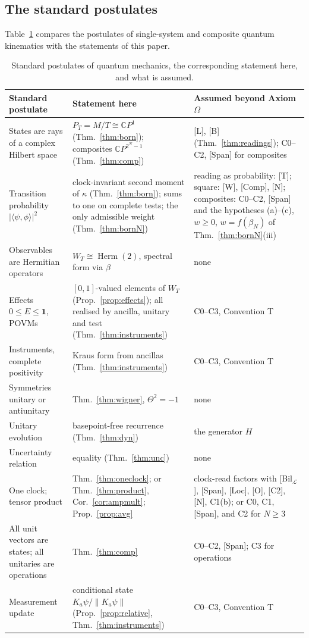 \documentclass[aps,pra,onecolumn,superscriptaddress,nofootinbib,10pt]{revtex4-2}
\theoremstyle{definition}
\theoremstyle{remark}
\newcommand{\C}{\mathbb{C}}
\newcommand{\cL}{\mathcal{L}}
\newcommand{\Herm}{\operatorname{Herm}}
\newcommand{\ip}[2]{\langle #1,#2\rangle}
\begin{document}
\subsection{The standard postulates}
Table~\ref{tab:postulates} compares the postulates of single-system and composite quantum kinematics
with the statements of this paper.

\begin{table}[h]
\caption{Standard postulates of quantum mechanics, the corresponding statement here, and what is assumed.}
\label{tab:postulates}
\footnotesize
\begin{tabular}{@{}p{}p{}p{}@{}}
\toprule
Standard postulate & Statement here & Assumed beyond Axiom $\Omega$\\
\midrule
States are rays of a complex Hilbert space & $P_T=M/T\cong\C P^1$ (Thm.~\ref{thm:born}); composites $\C P^{2^N-1}$ (Thm.~\ref{thm:comp}) & [L], [B] (Thm.~\ref{thm:readings}); C0--C2, [Span] for composites\\
Transition probability $\lvert\ip{\psi}{\phi}\rvert^2$ & clock-invariant second moment of $\kappa$ (Thm.~\ref{thm:born}); sums to one on complete tests; the only admissible weight (Thm.~\ref{thm:bornN}) & reading as probability: [T]; square: [W], [Comp], [N]; composites: C0--C2, [Span] and the hypotheses (a)--(c), $w\ge0$, $w=f(\beta_N)$ of Thm.~\ref{thm:bornN}(iii)\\
Observables are Hermitian operators & $W_T\cong\Herm(2)$, spectral form via $\beta$ & none\\
Effects $0\le E\le\mathbf1$, POVMs & $[0,1]$-valued elements of $W_T$ (Prop.~\ref{prop:effects}); all realised by ancilla, unitary and test (Thm.~\ref{thm:instruments}) & C0--C3, Convention T\\
Instruments, complete positivity & Kraus form from ancillas (Thm.~\ref{thm:instruments}) & C0--C3, Convention T\\
Symmetries unitary or antiunitary & Thm.~\ref{thm:wigner}, $\Theta^2=-1$ & none\\
Unitary evolution & basepoint-free recurrence (Thm.~\ref{thm:dyn}) & the generator $H$\\
Uncertainty relation & equality (Thm.~\ref{thm:unc}) & none\\
One clock; tensor product & Thm.~\ref{thm:oneclock}; or Thm.~\ref{thm:product}, Cor.~\ref{cor:ampmult}; Prop.~\ref{prop:avg} & clock-read factors with [Bil$_\cL$], [Span], [Loc], [O], [C2], [N], C1(b); or C0, C1, [Span], and C2 for $N\ge3$\\
All unit vectors are states; all unitaries are operations & Thm.~\ref{thm:comp} & C0--C2, [Span]; C3 for operations\\
Measurement update & conditional state $K_a\psi/\lVert K_a\psi\rVert$ (Prop.~\ref{prop:relative}, Thm.~\ref{thm:instruments}) & C0--C3, Convention T\\
\bottomrule
\end{tabular}
\end{table}
\end{document}
